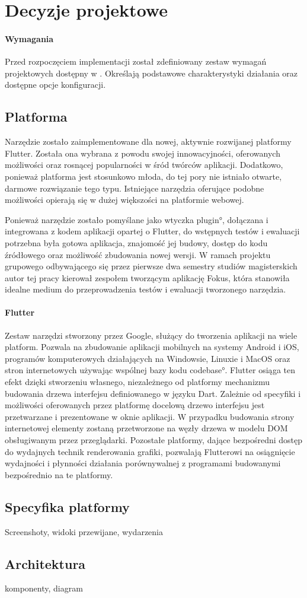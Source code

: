 \section{Decyzje projektowe}

\paragraph{Wymagania} Przed rozpoczęciem implementacji został zdefiniowany zestaw wymagań projektowych dostępny w . Określają podstawowe charakterystyki działania oraz dostępne opcje konfiguracji.

\subsection{Platforma}
Narzędzie zostało zaimplementowane dla nowej, aktywnie rozwijanej platformy Flutter. Została ona wybrana z powodu swojej innowacyjności, oferowanych możliwości oraz rosnącej popularności w śród twórców aplikacji. Dodatkowo, ponieważ platforma jest stosunkowo młoda, do tej pory nie istniało otwarte, darmowe rozwiązanie tego typu. Istniejące narzędzia oferujące podobne możliwości opierają się w dużej większości na platformie webowej.

Ponieważ narzędzie zostało pomyślane jako wtyczka \ang{plugin}, dołączana i integrowana z kodem aplikacji opartej o Flutter, do wstępnych testów i ewaluacji potrzebna była gotowa aplikacja, znajomość jej budowy, dostęp do kodu źródłowego oraz możliwość zbudowania nowej wersji. W ramach projektu grupowego odbywającego się przez pierwsze dwa semestry studiów magisterskich autor tej pracy kierował zespołem tworzącym aplikację Fokus, która stanowiła idealne medium do przeprowadzenia testów i ewaluacji tworzonego narzędzia.

\paragraph{Flutter} Zestaw narzędzi stworzony przez Google, służący do tworzenia aplikacji na wiele platform. Pozwala na zbudowanie aplikacji mobilnych na systemy Android i iOS, programów komputerowych działających na Windowsie, Linuxie i MacOS oraz stron internetowych używając wspólnej bazy kodu \ang{codebase}. Flutter osiąga ten efekt dzięki stworzeniu własnego, niezależnego od platformy mechanizmu budowania drzewa interfejsu definiowanego w języku Dart. Zależnie od specyfiki i możliwości oferowanych przez platformę docelową drzewo interfejsu jest przetwarzane i prezentowane w oknie aplikacji. W przypadku budowania strony internetowej elementy zostaną przetworzone na węzły drzewa w modelu DOM obsługiwanym przez przeglądarki. Pozostałe platformy, dające bezpośredni dostęp do wydajnych technik renderowania grafiki, pozwalają Flutterowi na osiągnięcie wydajności i płynności działania porównywalnej z programami budowanymi bezpośrednio na te platformy.

\subsection{Specyfika platformy}
Screenshoty, widoki przewijane, wydarzenia

\subsection{Architektura}
komponenty, diagram
